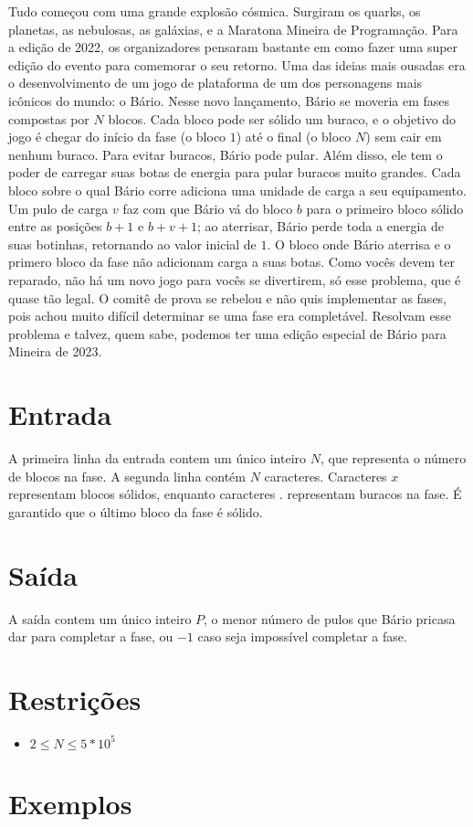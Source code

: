 Tudo começou com uma grande explosão cósmica. Surgiram os quarks, os planetas, as nebulosas, as galáxias, e a Maratona Mineira de Programação.
Para a edição de 2022, os organizadores pensaram bastante em como fazer uma super edição do evento para comemorar o seu retorno. Uma das ideias mais
ousadas era o desenvolvimento de um jogo de plataforma de um dos personagens mais icônicos do mundo: o Bário.
Nesse novo lançamento, Bário se moveria em fases compostas por $N$ blocos.
Cada bloco pode ser sólido um buraco, e o objetivo do jogo é chegar do início da fase (o bloco $1$) até o final (o bloco $N$) sem cair em nenhum buraco.
Para evitar buracos, Bário pode pular.
Além disso, ele tem o poder de carregar suas botas de energia para pular buracos muito grandes.
Cada bloco sobre o qual Bário corre adiciona uma unidade de carga a seu equipamento.
Um pulo de carga $v$ faz com que Bário vá do bloco $b$ para o primeiro bloco sólido entre as posições $b+1$ e $b+v+1$;
ao aterrisar, Bário perde toda a energia de suas botinhas, retornando ao valor inicial de $1$.
O bloco onde Bário aterrisa e o primero bloco da fase não adicionam carga a suas botas.
Como vocês devem ter reparado, não há um novo jogo para vocês se divertirem, só esse problema, que é quase tão legal.
O comitê de prova se rebelou e não quis implementar as fases, pois achou muito difícil determinar se uma fase era completável.
Resolvam esse problema e talvez, quem sabe, podemos ter uma edição especial de Bário para Mineira de 2023.



\section*{Entrada}

A primeira linha da entrada contem um único inteiro $N$, que representa o número de blocos na fase.
A segunda linha contém $N$ caracteres. Caracteres $x$ representam blocos sólidos, enquanto caracteres $.$ representam buracos na fase. É garantido que o último bloco da fase é sólido.

\section*{Saída}

A saída contem um único inteiro $P$, o menor número de pulos que Bário pricasa dar para completar a fase, ou $-1$ caso seja impossível completar a fase.

\section*{Restrições}

\begin{itemize}
\item $2 \leq N \leq 5 * 10^5$
\end{itemize}


\section*{Exemplos}

\exemplo
